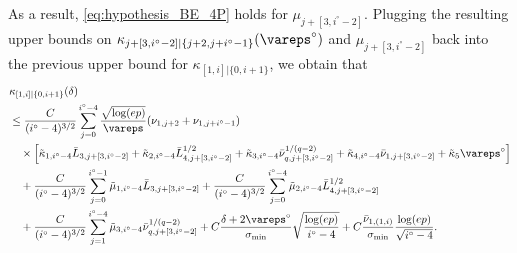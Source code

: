 \documentclass[aos]{imsart}
\begin{document}
\begin{appendix}
As a result, \eqref{eq:hypothesis_BE_4P} holds for $\mu_{j+[3,i^\circ-2]}$. Plugging the resulting upper bounds on $\kappa_{j+[3,i^\circ-2]|\{j+2, j+i^\circ-1\}}(\vareps^\circ)$ and $\mu_{j+[3,i^\circ-2]}$ back into the previous upper bound for $\kappa_{[1,i]|\{0,i+1\}}$, we obtain that
\begin{equation*} %
\begin{aligned}
    & \kappa_{[1,i]|\{0,i+1\}}(\delta) \\
    & \leq \frac{C}{(i^\circ-4)^{3/2}} \sum_{j=0}^{i^\circ-4}  
    \frac{\sqrt{\log(ep)}}{\vareps} (\nu_{1,j+2} + \nu_{1,j+i^\circ-1})
    \\
    & \quad \times \left[ 
        \tilde\kappa_{1,i^\circ-4} \bar{L}_{3,j+[3,i^\circ-2]}
        + \tilde\kappa_{2,i^\circ-4} \bar{L}_{4,j+[3,i^\circ-2]}^{1/2}
        + \tilde\kappa_{3,i^\circ-4} \bar{\nu}_{q,j+[3,i^\circ-2]}^{1/(q-2)}
        + \tilde\kappa_{4,i^\circ-4} \bar\nu_{1,j+[3,i^\circ-2]}
        + \tilde\kappa_{5} {\vareps^\circ}
    \right]
    \\
    & \quad + \frac{C}{(i^\circ-4)^{3/2}} \sum_{j=0}^{i^\circ-1} \tilde\mu_{1,i^\circ-4} {\bar{L}_{3,j+[3,i^\circ-2]}}
    + \frac{C}{(i^\circ-4)^{3/2}} \sum_{j=0}^{i^\circ-4} \tilde\mu_{2,i^\circ-4} {\bar{L}_{4,j+[3,i^\circ-2]}^{1/2}} \\
    &\quad + \frac{C}{(i^\circ-4)^{3/2}} \sum_{j=1}^{i^\circ-4} \tilde\mu_{3,i^\circ-4} {\bar{\nu}_{q,j+[3,i^\circ-2]}^{1/(q-2)}}
    + C\frac{\delta + 2\vareps^\circ}{\sigma_{\min}} \sqrt{\frac{\log(ep)}{i^\circ-4}}
    + C\frac{\bar\nu_{1,(1,i)}}{\sigma_{\min}} \frac{\log(ep)}{\sqrt{i^\circ-4}}.
\end{aligned}
\end{equation*}


\end{appendix}
\end{document}
